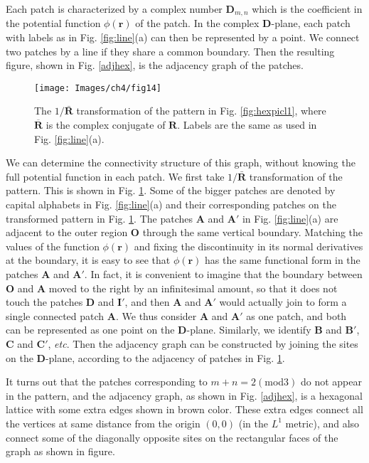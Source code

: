 \documentclass[11pt,a4paper]{book}
\begin{document}
Each patch is characterized by a complex number $\mathbf{D}_{m,n}$ which is the
coefficient  in the potential function $\phi\left( \mathbf{r} \right)$ of the patch. 
In the complex $\mathbf{D}$-plane, each patch with labels as in Fig. \ref{fig:line}(a) can then  be represented by a point. We
connect two patches by a line if they share a common boundary.
Then the resulting figure, shown in Fig. \ref{adjhex}, is the
adjacency graph of the patches. 
%
\begin{figure}[t]
\begin{center}
\texttt{[image: Images/ch4/fig14]}
\caption{The $1/\mathbf{\bar{R}}$ transformation of the pattern in
Fig. \ref{fig:hexpicl1}, where $\mathbf{\overline{R}}$ is the complex
conjugate of $\mathbf{R}$. Labels are the same as used in
Fig. \ref{fig:line}(a).}
\label{fig:1byz}
\end{center}
\end{figure}
%

We can determine the connectivity structure of this graph, without
knowing the full potential function in each patch. We first take
$1/\mathbf{\bar{R}}$
transformation of the pattern. This is shown in Fig. \ref{fig:1byz}. 
Some of the bigger patches are denoted by capital alphabets in
Fig. \ref{fig:line}(a) and their corresponding patches on the
transformed pattern in Fig. \ref{fig:1byz}.
The patches $\textbf{A}$ and $\textbf{A}'$ in Fig. \ref{fig:line}(a) are adjacent
to the outer region $\textbf{O}$ through the same vertical boundary.
Matching the values of the function $\phi( \mathbf{r})$ and fixing the discontinuity in its normal derivatives at the boundary,
it is easy to see that $\phi(\mathbf{r})$ has the same functional form in the
patches $\textbf{A}$ and $\textbf{A}'$. In fact, it is convenient to
imagine that the boundary between $\textbf{O}$ and $\textbf{A}$ moved
to the right by an infinitesimal amount, so that it
does not touch the patches $\textbf{D}$ and $\textbf{I}'$, and then
$\textbf{A}$ and $\textbf{A}'$ would actually
join to form a single connected patch $\textbf{A}$. We thus consider
$\textbf{A}$ and $\textbf{A}'$ as one patch, and both can be
represented as one point
on the $\mathbf{D}$-plane. Similarly, we identify $\textbf{B}$ and $\textbf{B}'$, $\textbf{C}$
and $\textbf{C}'$, \textit{etc}. 
Then the adjacency graph can be
constructed by joining the sites on the $\mathbf{D}$-plane, according
to the adjacency of patches in Fig. \ref{fig:1byz}.

It turns out that the patches corresponding to $m+n=2\left(
\right.$mod$\left. 3 \right)$ do not appear in the pattern, and
the adjacency graph, as shown in Fig. \ref{adjhex}, is a hexagonal lattice with some extra edges shown in
brown color. These extra edges connect all the vertices at same distance from the origin $\left( 0,0
\right)$ (in the $L^{1}$ metric), and also connect some of the
diagonally opposite sites on the rectangular faces of the graph as shown in figure.
\end{document}
